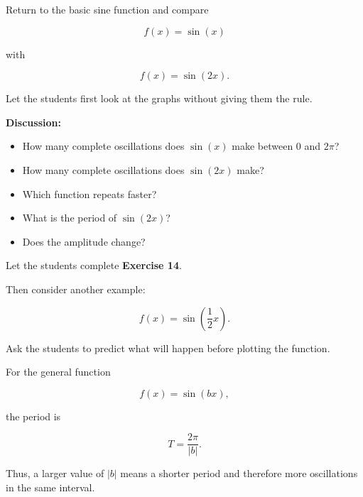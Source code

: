 \documentclass[a4paper,11pt]{article}
\begin{document}
Return to the basic sine function and compare

\begin{equation}
    f(x)=\sin(x)
\end{equation}

with

\begin{equation}
    f(x)=\sin(2x).
\end{equation}

Let the students first look at the graphs without giving them the rule.

\textbf{Discussion:}

\begin{itemize}
    \item How many complete oscillations does $\sin(x)$ make between
    $0$ and $2\pi$?
    \item How many complete oscillations does $\sin(2x)$ make?
    \item Which function repeats faster?
    \item What is the period of $\sin(2x)$?
    \item Does the amplitude change?
\end{itemize}

Let the students complete \textbf{Exercise 14}.

Then consider another example:

\begin{equation}
    f(x)=\sin\left(\frac{1}{2}x\right).
\end{equation}

Ask the students to predict what will happen before plotting the function.

For the general function

\begin{equation}
    f(x)=\sin(bx),
\end{equation}

the period is

\begin{equation}
    \boxed{T=\frac{2\pi}{|b|}}.
\end{equation}

Thus, a larger value of $|b|$ means a shorter period and therefore
more oscillations in the same interval.

\begin{center}
\end{center}
\end{document}
